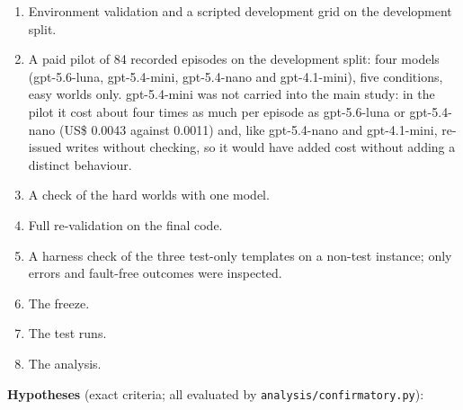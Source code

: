 \documentclass[
  10pt,
]{article}
\providecommand{\tightlist}{%
  \setlength{\itemsep}{0pt}\setlength{\parskip}{0pt}}
\begin{document}
\begin{enumerate}
\def\labelenumi{\arabic{enumi}.}
\tightlist
\item
  Environment validation and a scripted development grid on the
  development split.
\item
  A paid pilot of 84 recorded episodes on the development split: four
  models (gpt-5.6-luna, gpt-5.4-mini, gpt-5.4-nano and gpt-4.1-mini),
  five conditions, easy worlds only. gpt-5.4-mini was not carried into
  the main study: in the pilot it cost about four times as much per
  episode as gpt-5.6-luna or gpt-5.4-nano (US\$ 0.0043 against 0.0011)
  and, like gpt-5.4-nano and gpt-4.1-mini, re-issued writes without
  checking, so it would have added cost without adding a distinct
  behaviour.
\item
  A check of the hard worlds with one model.
\item
  Full re-validation on the final code.
\item
  A harness check of the three test-only templates on a non-test
  instance; only errors and fault-free outcomes were inspected.
\item
  The freeze.
\item
  The test runs.
\item
  The analysis.
\end{enumerate}

\textbf{Hypotheses} (exact criteria; all evaluated by
\texttt{analysis/confirmatory.py}):
\end{document}
